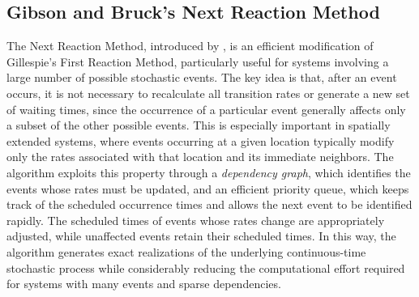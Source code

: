 \subsection{Gibson and Bruck's Next Reaction Method}
The Next Reaction Method, introduced by  \cite{GibsonBruck2000}, is an efficient modification of Gillespie's First Reaction Method, particularly useful for systems involving a large number of possible stochastic events. The key idea is that, after an event occurs, it is not necessary to recalculate all transition rates or generate a new set of waiting times, since the occurrence of a particular event generally affects only a subset of the other possible events. This is especially important in spatially extended systems, where events occurring at a given location typically modify only the rates associated with that location and its immediate neighbors. The algorithm exploits this property through a {\em dependency graph}, which identifies the events whose rates must be updated, and an efficient priority queue, which keeps track of the scheduled occurrence times and allows the next event to be identified rapidly. The scheduled times of events whose rates change are appropriately adjusted, while unaffected events retain their scheduled times. In this way, the algorithm generates exact realizations of the underlying continuous-time stochastic process while considerably reducing the computational effort required for systems with many events and sparse dependencies.



